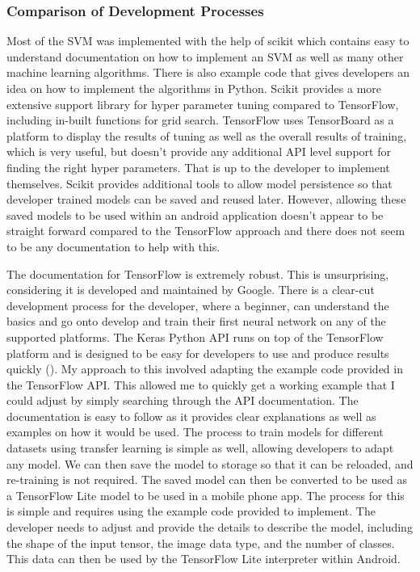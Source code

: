 \documentclass{article}
\begin{document}
\subsubsection*{Comparison of Development Processes}
Most of the SVM was implemented with the help of scikit which contains easy to understand documentation on how to 
implement an SVM as well as many other machine learning algorithms. There is also example code that gives developers an 
idea on how to implement the algorithms in Python. Scikit provides a more extensive support library for hyper parameter 
tuning compared to TensorFlow, including in-built functions for grid search. TensorFlow uses TensorBoard as a platform 
to display the results of tuning as well as the overall results of training, which is very useful, but doesn't provide 
any additional API level support for finding the right hyper parameters. That is up to the developer to implement 
themselves. Scikit provides additional tools to allow model persistence so that developer trained models can be saved 
and reused later. However, allowing these saved models to be used within an android application doesn't appear to be 
straight forward compared to the TensorFlow approach and there does not seem to be any documentation to help with this. 

\par

The documentation for TensorFlow is extremely robust. This is unsurprising, considering it is developed and maintained 
by Google. There is a clear-cut development process for the developer, where a beginner, can understand the basics and 
go onto develop and train their first neural network on any of the supported platforms. The Keras Python API runs on 
top of the TensorFlow platform and is designed to be easy for developers to use and produce results quickly 
(\cite{kerasabout}). My approach to this involved adapting the example code provided in the TensorFlow API. This allowed
me to quickly get a working example that I could adjust by simply searching through the API documentation. The 
documentation is easy to follow as it provides clear explanations as well as examples on how it would be used. The 
process to train models for different datasets using transfer learning is simple as well, allowing developers to adapt 
any model. We can then save the model to storage so that it can be reloaded, and re-training is not required. The saved 
model can then be converted to be used as a TensorFlow Lite model to be used in a mobile phone app. The process for this
is simple and requires using the example code provided to implement. The developer needs to adjust and provide the 
details to describe the model, including the shape of the input tensor, the image data type, and the number of classes. 
This data can then be used by the TensorFlow Lite interpreter within Android.
\end{document}
